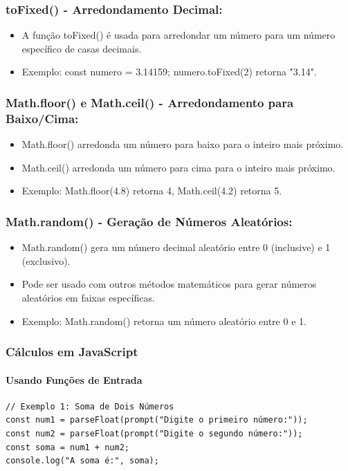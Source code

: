 \documentclass[13pt, xcolor={dvipsnames,svgnames}, portuguese]{beamer}
\begin{document}
\begin{frame}
\frametitle{toFixed() - Arredondamento Decimal:}
\begin{itemize}
  \item A função toFixed() é usada para arredondar um número para um número específico de casas decimais.
  \item Exemplo: const numero = 3.14159; numero.toFixed(2) retorna "3.14".
\end{itemize}
\end{frame}

\begin{frame}
\frametitle{Math.floor() e Math.ceil() - Arredondamento para Baixo/Cima:}

\begin{itemize}
  \item Math.floor() arredonda um número para baixo para o inteiro mais próximo.
  \item Math.ceil() arredonda um número para cima para o inteiro mais próximo.
  \item Exemplo: Math.floor(4.8) retorna 4, Math.ceil(4.2) retorna 5.
\end{itemize}

\end{frame}


\begin{frame}
\frametitle{Math.random() - Geração de Números Aleatórios:}
\begin{itemize}
  \item Math.random() gera um número decimal aleatório entre 0 (inclusive) e 1 (exclusivo).
  \item Pode ser usado com outros métodos matemáticos para gerar números aleatórios em faixas específicas.
  \item Exemplo: Math.random() retorna um número aleatório entre 0 e 1.
\end{itemize}
\end{frame}


\begin{frame}[fragile]
\frametitle{Cálculos em JavaScript}
\framesubtitle{Usando Funções de Entrada}

\begin{verbatim}
// Exemplo 1: Soma de Dois Números
const num1 = parseFloat(prompt("Digite o primeiro número:"));
const num2 = parseFloat(prompt("Digite o segundo número:"));
const soma = num1 + num2;
console.log("A soma é:", soma);
\end{verbatim}
\end{frame}
\end{document}
